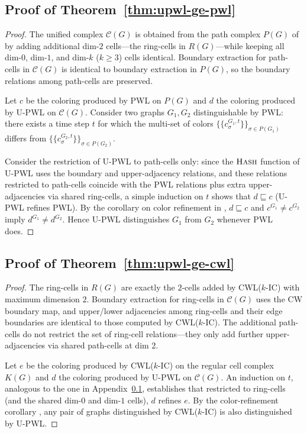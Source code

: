 \documentclass[letterpaper]{article} %
\begin{document}
\subsection{Proof of Theorem~\ref{thm:upwl-ge-pwl}} \label{app:proof-upwl-pwl}
\begin{proof}
    The unified complex \(\mathcal{C}(G)\) is obtained from the path complex \(P(G)\) of \cite{truong_weisfeiler_2024} by adding additional dim-\(2\) cells---the ring-cells in \(R(G)\)---while keeping all dim-\(0\), dim-\(1\), and dim-\(k\) (\(k \geq 3\)) cells identical. Boundary extraction for path-cells in \(\mathcal{C}(G)\) is identical to boundary extraction in \(P(G)\), so the boundary relations among path-cells are preserved.

    Let \(c\) be the coloring produced by PWL on \(P(G)\) and \(d\) the coloring produced by U-PWL on \(\mathcal{C}(G)\). Consider two graphs \(G_1, G_2\) distinguishable by PWL: there exists a time step \(t\) for which the multi-set of colors \(\{\!\!\{c_\sigma^{G_1, t}\}\!\!\}_{\sigma \in P(G_1)}\) differs from \(\{\!\!\{c_\sigma^{G_2, t}\}\!\!\}_{\sigma \in P(G_2)}\).

    Consider the restriction of U-PWL to path-cells only: since the \(\textsc{Hash}\) function of U-PWL uses the boundary and upper-adjacency relations, and these relations restricted to path-cells coincide with the PWL relations plus extra upper-adjacencies via shared ring-cells, a simple induction on \(t\) shows that \(d \sqsubseteq c\) (U-PWL refines PWL). By the corollary on color refinement in \cite{truong_weisfeiler_2024}, \(d \sqsubseteq c\) and \(c^{G_1} \neq c^{G_2}\) imply \(d^{G_1} \neq d^{G_2}\). Hence U-PWL distinguishes \(G_1\) from \(G_2\) whenever PWL does.
\end{proof}

\subsection{Proof of Theorem~\ref{thm:upwl-ge-cwl}} \label{app:proof-upwl-cwl}
\begin{proof}
    The ring-cells in \(R(G)\) are exactly the \(2\)-cells added by CWL(\(k\)-IC) with maximum dimension \(2\). Boundary extraction for ring-cells in \(\mathcal{C}(G)\) uses the CW boundary map, and upper/lower adjacencies among ring-cells and their edge boundaries are identical to those computed by CWL(\(k\)-IC). The additional path-cells do not restrict the set of ring-cell relations---they only add further upper-adjacencies via shared path-cells at dim \(2\).

    Let \(e\) be the coloring produced by CWL(\(k\)-IC) on the regular cell complex \(K(G)\) and \(d\) the coloring produced by U-PWL on \(\mathcal{C}(G)\). An induction on \(t\), analogous to the one in Appendix~\ref{app:proof-upwl-pwl}, establishes that restricted to ring-cells (and the shared dim-\(0\) and dim-\(1\) cells), \(d\) refines \(e\). By the color-refinement corollary \cite{bodnar_weisfeiler_2022}, any pair of graphs distinguished by CWL(\(k\)-IC) is also distinguished by U-PWL.
\end{proof}
\end{document}
